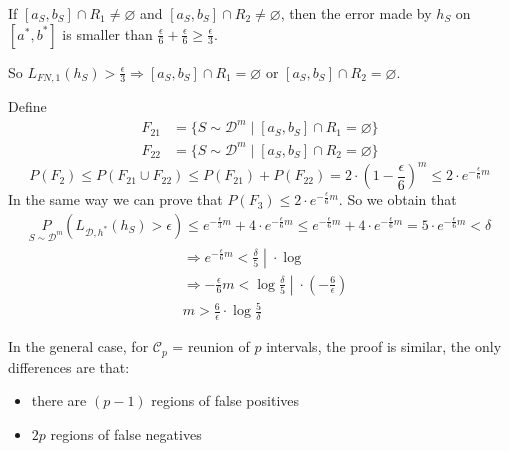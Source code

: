 \documentclass{article}
\newcommand{\<}{\langle}
\renewcommand{\>}{\rangle}
\renewcommand{\emptyset}{\varnothing}
\theoremstyle{definition}
\def\gC{{\mathcal{C}}}
\def\gD{{\mathcal{D}}}
\newcommand{\uset}{\underset}
\newcommand{\uset}{\underset}
\begin{document}
If $[a_S, b_S] \cap R_1 \neq \emptyset$ and $[a_S, b_S] \cap R_2 \neq \emptyset$, then the error
made by $h_S$ on $[a^*, b^*]$ is smaller than
$\frac{\epsilon}{6} + \frac{\epsilon}{6} \geq \frac{\epsilon}{3}$.  %

So $L_{FN, 1}(h_S) > \frac{\epsilon}{3} \Rightarrow [a_S, b_S] \cap R_1 = \emptyset$ or
$[a_S, b_S] \cap R_2 = \emptyset$.

Define
\begin{align*}
  F_{21} &= \{S \sim \gD^m \mid [a_S, b_S] \cap R_1 = \emptyset\} \\
  F_{22} &= \{S \sim \gD^m \mid [a_S, b_S] \cap R_2 = \emptyset\}
\end{align*}
\begin{equation*}
  P(F_2) \leq P(F_{21} \cup F_{22})
         \leq P(F_{21}) + P(F_{22})
         = 2 \cdot \left(1-\frac{\epsilon}{6}\right)^m
         \leq 2 \cdot e^{-\frac{\epsilon}{6}m}
\end{equation*}
In the same way we can prove that $P(F_3) \leq 2 \cdot e^{-\frac{\epsilon}{6}m}$.
So we obtain that
\begin{align*}
  \uset{S \sim \gD^m}{P}(L_{\gD, h^*}(h_S) > \epsilon )
    \leq e^{-\frac{\epsilon}{3}m} + 4 \cdot e^{-\frac{\epsilon}{6}m}
    \leq e^{-\frac{\epsilon}{6}m} + 4 \cdot e^{-\frac{\epsilon}{6}m}
    = 5 \cdot e^{-\frac{\epsilon}{6}m}
    < \delta
\end{align*}
\begin{align*}
  &\Rightarrow e^{-\frac{\epsilon}{6}m} < \left. \frac{\delta}{5}
    \; \right\lvert \; \cdot \log \\
  &\Rightarrow -\frac{\epsilon}{6}m < \left. \log \frac{\delta}{5}
    \; \right\lvert \; \cdot \left(-\frac{6}{\epsilon}\right) \\
  &\boxed{m > \frac{6}{\epsilon} \cdot \log \frac{5}{\delta}}
\end{align*}

In the general case, for $\gC_p$ = reunion of $p$ intervals, the proof is similar, the only
differences are that:
\begin{itemize}[label=-]
  \item there are $(p-1)$ regions of false positives
  \item $2p$ regions of false negatives
\end{itemize}
\end{document}
